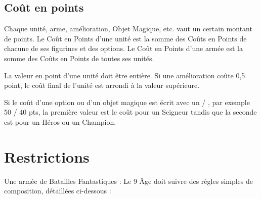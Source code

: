 \subsection{Coût en points}

Chaque unité, arme, amélioration, Objet Magique, etc. vaut un certain montant de points. Le Coût en Points d'une unité est la somme des Coûts en Points de chacune de ses figurines et des options. Le Coût en Points d'une armée est la somme des Coûts en Points de toutes ses unités.

\noindent\textbf{}

La valeur en point d'une unité doit être entière. Si une amélioration coûte 0,5 point, le coût final de l'unité est arrondi à la valeur supérieure.

\noindent\textbf{}

Si le coût d'une option ou d'un objet magique est écrit avec un \og / \fg{}, par exemple 50 / 40 pts, la première valeur est le coût pour un Seigneur tandis que la seconde est pour un Héros ou un Champion.

\section{Restrictions}

Une armée de Batailles Fantastiques : Le 9\ieme{} Âge doit suivre des règles simples de composition, détaillées ci-dessous :

